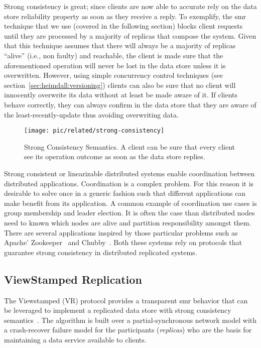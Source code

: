 Strong consistency is great; since clients are now able to accurate rely on the data store reliability property as soon as they receive a reply. 
To exemplify, the \gls{smr} technique that we use (covered in the following section) blocks client requests until they are processed by a majority of replicas that compose the system. 
Given that this technique assumes that there will always be a majority of replicas ``alive'' (i.e., non faulty) and reachable, the client is made sure that the aforementioned operation will never be lost in the data store unless it is overwritten. 
However, using simple concurrency control techniques (see section~\ref{sec:heimdall:versioning}) clients can also be sure that no client will innocently overwrite its data without at least  be made aware of it. 
If clients behave correctly, they can always confirm in the data store that they are aware of the least-recently-update thus avoiding overwriting data.

\begin{figure}[ht]
  \centering
  \texttt{[image: pic/related/strong-consistency]}
  \caption[Strong Consistency Semantics]{Strong Consistency Semantics. A client can be sure that every client see its operation outcome as soon as the data store replies.}
  \label{fig:related:strong}
\end{figure}
Strong consistent or linearizable distributed systems enable coordination between distributed applications. 
Coordination is a complex problem. For this reason it is desirable to solve once in a generic fashion such that different applications can make benefit from its application. 
A common example of coordination use cases is group membership and leader election.
It is often the case than distributed nodes need to known which nodes are alive and partition responsibility amongst them. 
There are several applications inspired by those particular problems such as Apache' Zookeeper~\cite{Hun10} and Chubby~\cite{burrows2006chubby}. 
Both these systems rely on protocols that guarantee strong consistency in distributed replicated systems. 

\subsection{ViewStamped Replication}
\label{sec:related:viewst-repl}
The Viewstamped (VR) protocol provides a transparent \gls{smr}  behavior that can be leveraged to implement a replicated data store with strong consistency semantics~\cite{Liskov:2012ut,Liskov:2010vt}. 
The algorithm is built over  a partial-synchronous  network model with a crash-recover failure model for the participants (\emph{replicas}) who are the basis for maintaining a data service  available to clients. 

